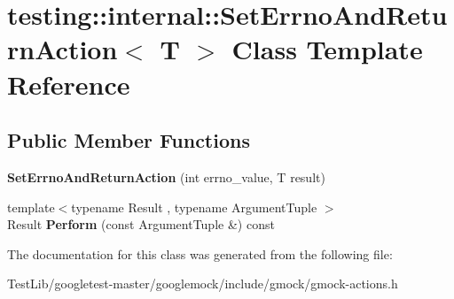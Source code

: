 \hypertarget{classtesting_1_1internal_1_1SetErrnoAndReturnAction}{}\section{testing\+:\+:internal\+:\+:Set\+Errno\+And\+Return\+Action$<$ T $>$ Class Template Reference}
\label{classtesting_1_1internal_1_1SetErrnoAndReturnAction}
\subsection*{Public Member Functions}
\begin{DoxyCompactItemize}
\item 
\mbox{\label{classtesting_1_1internal_1_1SetErrnoAndReturnAction_abfe5a194a9b8f2b303c635ad99b3a257}} 
{\bfseries Set\+Errno\+And\+Return\+Action} (int errno\+\_\+value, T result)
\item 
\mbox{\label{classtesting_1_1internal_1_1SetErrnoAndReturnAction_a44025d0d124cab72878bf6bdb12c3693}} 
{\footnotesize template$<$typename Result , typename Argument\+Tuple $>$ }\\Result {\bfseries Perform} (const Argument\+Tuple \&) const
\end{DoxyCompactItemize}


The documentation for this class was generated from the following file\+:\begin{DoxyCompactItemize}
\item 
Test\+Lib/googletest-\/master/googlemock/include/gmock/gmock-\/actions.\+h\end{DoxyCompactItemize}
